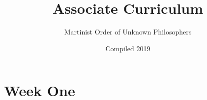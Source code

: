 \documentclass[]{book}
\title{Associate Curriculum}
\author{Martinist Order of Unknown Philosophers}
\date{Compiled 2019}
\begin{document}
	
	\maketitle
	
	\part{Week One}
	
	
\end{document}

